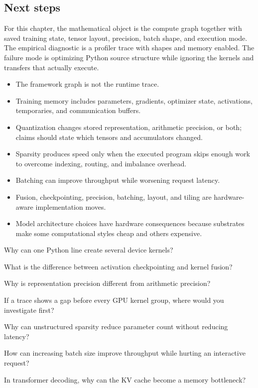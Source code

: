 \subsection{Next steps}

For this chapter, the mathematical object is the compute graph together with saved training state, tensor layout, precision, batch shape, and execution mode. The empirical diagnostic is a profiler trace with shapes and memory enabled. The failure mode is optimizing Python source structure while ignoring the kernels and transfers that actually execute.

\begin{chaptersummary}
\begin{itemize}[leftmargin=*]
  \item The framework graph is not the runtime trace.
  \item Training memory includes parameters, gradients, optimizer state, activations, temporaries, and communication buffers.
  \item Quantization changes stored representation, arithmetic precision, or both; claims should state which tensors and accumulators changed.
  \item Sparsity produces speed only when the executed program skips enough work to overcome indexing, routing, and imbalance overhead.
  \item Batching can improve throughput while worsening request latency.
  \item Fusion, checkpointing, precision, batching, layout, and tiling are hardware-aware implementation moves.
  \item Model architecture choices have hardware consequences because substrates make some computational styles cheap and others expensive.
\end{itemize}
\end{chaptersummary}

\begin{conceptquestions}
\item Why can one Python line create several device kernels?
\item What is the difference between activation checkpointing and kernel fusion?
\item Why is representation precision different from arithmetic precision?
\item If a trace shows a gap before every GPU kernel group, where would you investigate first?
\item Why can unstructured sparsity reduce parameter count without reducing latency?
\item How can increasing batch size improve throughput while hurting an interactive request?
\item In transformer decoding, why can the KV cache become a memory bottleneck?
\end{conceptquestions}

